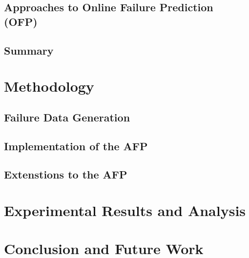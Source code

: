 \documentclass[12pt,letterpaper,oneside]{book}
\begin{document}



\section{Approaches to Online Failure Prediction (OFP)} \label{approaches}





\section{Summary} \label{litReviewSummary}


\chapter{Methodology}


\section{Failure Data Generation} \label{sec:generation}


\section{Implementation of the AFP} \label{sec:implementation}


\section{Extenstions to the AFP} \label{sec:extensions}


\chapter{Experimental Results and Analysis}

\chapter{Conclusion and Future Work}


\backmatter
	\singlespace
	
	 
	
	\clearpage
	
\end{document}
